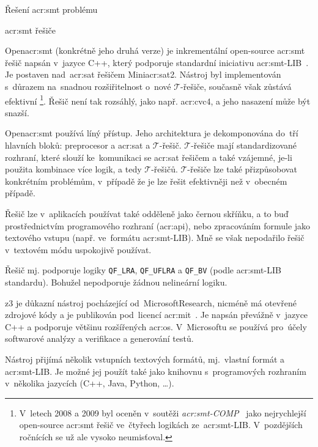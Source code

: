 \documentclass[thesis=M,czech]{FITthesis}[2012/06/26]
\newcommand{\acrlabel}[1]{acr:#1}
\newcommand{\acr}[1]{\acrshort{\acrlabel{#1}}}
\newcommand{\id}[1]{\texttt{#1}}
\newcommand{\hl}[1]{\textit{#1}}
\newcommand{\name}[1]{\hl{#1}}
\newcommand{\cit}[1]{\cite{#1}}
\newcommand{\reg}{\textsuperscript{\textregistered}}
\newcommand{\set}[1]{\ensuremath{\mathcal{#1}}}
\begin{document}
\begin{section}{Řešení \acr{smt} problému}
\begin{subsection}{\acr{smt} řešiče}

\begin{paragraph}{Open\acr{smt}}\label{p:search:smt:solver:opensmt}
(konkrétně jeho druhá verze)
je inkrementální open-source \acr{smt} řešič napsán v~jazyce C++,
který podporuje standardní iniciativu
\acr{smt}-LIB~\cit{opensmt}\cit{opensmt-art}.
Je postaven
nad~\acr{sat} řešičem Mini\acr{sat}2.
Nástroj byl implementován
s~důrazem na~snadnou rozšiřitelnost o~nové \set{T}-řešiče,
současně však zůstává efektivní%
\footnote{V~letech 2008 a 2009
byl oceněn v~soutěži
\name{\acr{smt}-COMP}~\cit{smtcomp}\cit{smtcomp-art}
jako nejrychlejší open-source \acr{smt} řešič
ve~čtyřech logikách ze~\acr{smt}-LIB.
V~pozdějších ročnících se už ale vysoko neumisťoval.}.
Řešič není tak rozsáhlý,
jako např. \acr{cvc}4,
a jeho nasazení může být snazší.

Open\acr{smt} používá líný přístup.
Jeho architektura je dekomponována do~tří hlavních bloků:
preprocesor a \acr{sat} a \set{T}-řešič.
\set{T}-řešiče mají standardizované rozhraní,
které slouží ke~komunikaci se \acr{sat} řešičem a také vzájemné,
je-li použita kombinace více logik, a tedy \set{T}-řešičů.
\set{T}-řešiče lze také přizpůsobovat
konkrétním problémům,
v~případě že je lze řešit efektivněji než v~obecném případě.

Řešič lze v~aplikacích používat také odděleně
jako černou skříňku,
a to buď prostřednictvím programového rozhraní (\acr{api}),
nebo zpracováním formule jako textového vstupu
(např. ve~formátu \acr{smt}-LIB).
Mně se však nepodařilo řešič v~textovém módu uspokojivě používat.

Řešič mj. podporuje logiky
\id{QF\_\-LRA}, \id{QF\_\-UFLRA} a \id{QF\_\-BV}
(podle \acr{smt}-LIB standardu).
Bohužel nepodporuje žádnou nelineární logiku.
\end{paragraph} %


\begin{paragraph}{z3}\label{p:search:smt:solver:z3}
je důkazní nástroj pocházející od~Microsoft\reg Research,
nicméně má otevřené zdrojové kódy
a je publikován pod~licencí \acr{mit}~\cit{z3-art}\cit{z3}.
Je napsán převážně v~jazyce C++
a podporuje většinu rozšířených \acr{os}.
V~Microsoftu se používá
pro~účely softwarové analýzy a verifikace
a generování testů.

Nástroj přijímá několik vstupních textových formátů,
mj.~vlastní formát a \acr{smt}-LIB.
Je možné jej použít také jako knihovnu
s~programových rozhraním
v~několika jazycích (C++, Java, Python, \dots).


\end{paragraph}
\end{subsection}
\end{section}
\end{document}
